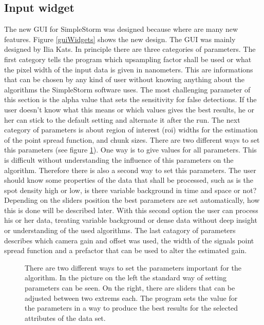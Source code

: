 \subsection{Input widget}
The new GUI for SimpleStorm was designed because where are many new features. Figure \ref{guiWidgets} shows the new design. The GUI was mainly designed by Ilia Kats.
In principle there are three categories of parameters. The first category tells the program which upsampling factor shall be used or what the pixel width of the input data is given in nanometers. This are informations that can be chosen by any kind of user without knowing anything about the algorithms  the SimpleStorm software uses. The most challenging parameter of this section is the alpha value that sets the sensitivity for false detections. If the user doesn't know what this means or which values gives the best results, he or her can stick to the default setting and alternate it after the run. \newline
The next category of parameters is about region of interest (roi) widths for the estimation of the point spread function, and chunk sizes. There are two different ways to set this parameters (see figure \ref{guiSettings}). One way is to give values for all parameters. This is difficult without understanding the influence of this parameters on the algorithm. Therefore there is also a second way to set this parameters. The user should know some properties of the data that shall be processed, such as is the spot density high or low, is there variable background in time and space or not? Depending on the sliders position the best parameters are set automatically, how this is done will be described later. With this second option the user can process his or her data, treating variable background or dense data without deep insight or understanding of the used algorithms.\newline
The last catagory of parameters describes which camera gain and offset was used, the width of the signals point spread function and a prefactor that can be used to alter the estimated gain. 
\begin{figure}
\hfill
{}
	\caption{There are two different ways to set the parameters important for the algorithm. In the picture on the left the standard way of setting parameters can be seen. On the right, there are sliders that can be adjusted between two extrems each. The program sets the value for the parameters in a way to produce the best results for the selected attributes of the data set.}
	\label{guiSettings}	
\end{figure}
